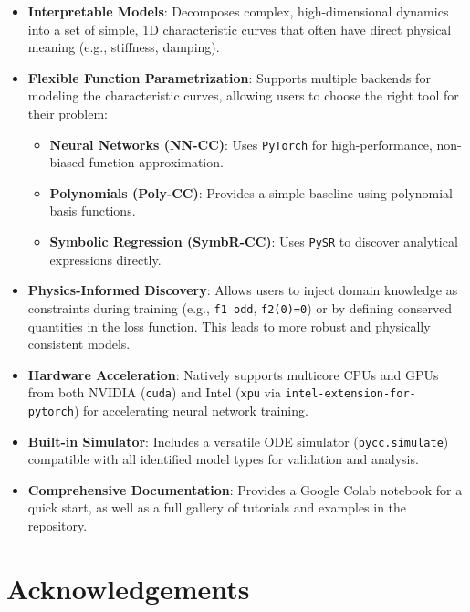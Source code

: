 \begin{itemize}
\tightlist
\item
  \textbf{Interpretable Models}: Decomposes complex, high-dimensional
  dynamics into a set of simple, 1D characteristic curves that often
  have direct physical meaning (e.g., stiffness, damping).
\item
  \textbf{Flexible Function Parametrization}: Supports multiple backends
  for modeling the characteristic curves, allowing users to choose the
  right tool for their problem:

  \begin{itemize}
  \tightlist
  \item
    \textbf{Neural Networks (NN-CC)}: Uses \texttt{PyTorch}
    \autocite{Paszke2019pytorch} for high-performance, non-biased
    function approximation.
  \item
    \textbf{Polynomials (Poly-CC)}: Provides a simple baseline using
    polynomial basis functions.
  \item
    \textbf{Symbolic Regression (SymbR-CC)}: Uses \texttt{PySR}
    \autocite{Cranmer2023PySR} to discover analytical expressions
    directly.
  \end{itemize}
\item
  \textbf{Physics-Informed Discovery}: Allows users to inject domain
  knowledge as constraints during training (e.g.,
  \texttt{\textquotesingle{}f1\ odd\textquotesingle{}},
  \texttt{\textquotesingle{}f2(0)=0\textquotesingle{}}) or by defining
  conserved quantities in the loss function. This leads to more robust
  and physically consistent models.
\item
  \textbf{Hardware Acceleration}: Natively supports multicore CPUs and
  GPUs from both NVIDIA (\texttt{cuda}) and Intel (\texttt{xpu} via
  \texttt{intel-extension-for-pytorch}) for accelerating neural network
  training.
\item
  \textbf{Built-in Simulator}: Includes a versatile ODE simulator
  (\texttt{pycc.simulate}) compatible with all identified model types
  for validation and analysis.
\item
  \textbf{Comprehensive Documentation}: Provides a Google Colab notebook
  for a quick start, as well as a full gallery of tutorials and examples
  in the repository.
\end{itemize}

\hypertarget{acknowledgements}{%
\section{Acknowledgements}\label{acknowledgements}}


